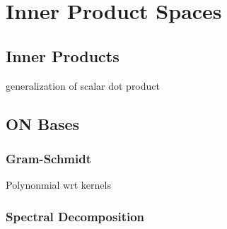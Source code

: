 \chapter{Inner Product Spaces}\label{ch:ipspace}
\section{Inner Products}
generalization of scalar dot product
\section{ON Bases}
\subsection{Gram-Schmidt}
Polynonmial wrt kernels
\subsection{Spectral Decomposition}

